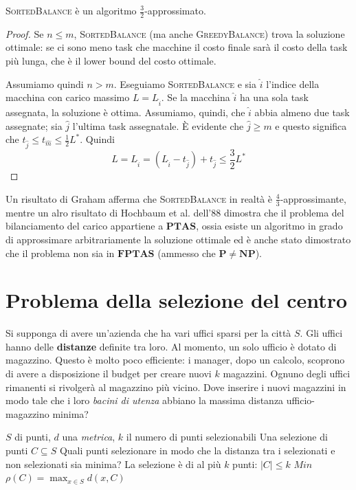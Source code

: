 \begin{theorem}
	\textsc{SortedBalance} è un algoritmo $\frac{3}{2}$-approssimato.
\end{theorem}
\begin{proof}
	Se $n \leq m$, \textsc{SortedBalance} (ma anche \textsc{GreedyBalance}) trova la soluzione
	ottimale: se ci sono meno task che macchine il costo finale sarà il costo
	della task più lunga, che è il lower bound del costo ottimale.

	Assumiamo quindi $n > m$.
	Eseguiamo \textsc{SortedBalance} e sia $\hat{i}$ l'indice della macchina con
	carico massimo $L = L_{\hat{i}}$. Se la macchina $\hat{i}$ ha una sola task
	assegnata, la soluzione è ottima. Assumiamo, quindi, che $\hat{i}$ abbia almeno
	due task assegnate; sia $\hat{j}$ l'ultima task assegnatale. \`E evidente che
	$\hat{j} \geq m$ e questo significa che $t_{\hat{j}} \leq t_{\hat{m}} \leq \frac{1}{2}L^*$.
	Quindi
	$$
		L = L_{\hat{i}} = (L_{\hat{i}} - t_{\hat{j}}) + t_{\hat{j}} \leq \frac{3}{2}L^*
	$$
\end{proof}
Un risultato di Graham afferma che \textsc{SortedBalance} in realtà è
$\frac{4}{3}$-approssimante, mentre un alro risultato di Hochbaum et al. dell'88
dimostra che il problema del bilanciamento del carico appartiene a $\mathbf{PTAS}$,
ossia esiste un algoritmo in grado di approssimare arbitrariamente la soluzione
ottimale ed è anche stato dimostrato che il problema non sia in $\mathbf{FPTAS}$ (ammesso
che $\mathbf{P} \neq \mathbf{NP}$).

\section{Problema della selezione del centro}
Si supponga di avere un'azienda che ha vari uffici sparsi per la città $S$.
Gli uffici hanno delle \textbf{distanze} definite tra loro. Al momento, un solo
ufficio è dotato di magazzino. Questo è molto poco efficiente: i manager, dopo
un calcolo, scoprono di avere a disposizione il budget per creare nuovi $k$
magazzini. Ognuno degli uffici rimanenti si rivolgerà al magazzino più
vicino. Dove inserire i nuovi magazzini in modo tale che i loro \textit{bacini di utenza}
abbiano la massima distanza ufficio-magazzino minima?

 {$S$ di punti, $d$ una \textit{metrica}, $k$ il numero di
	punti selezionabili} {Una selezione di punti $C \subseteq S$}
{Quali punti selezionare in modo che la distanza tra i selezionati e
	non selezionati sia minima?} {La selezione è di al più $k$ punti: $|C| \leq k$}
{$Min$}{$\rho(C) = \max_{x \in S} d(x, C)$}

